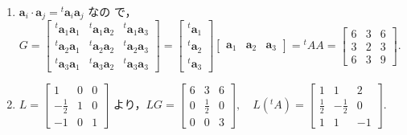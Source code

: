 \documentclass[11pt, uplatex, dvipdfmx]{jsarticle}
\begin{document}
\begin{enumerate}
\begin{enumerate}[(1)]
  \item $\bm{a}_i \cdot \bm{a}_j = {}^{t}\bm{a}_i \bm{a}_j$ なの
    で，$G= \left[
      \begin{array}{ccc}
        {}^{t}\bm{a}_1 \bm{a}_1 & {}^{t} \bm{a}_1 \bm{a}_2 & {}^{t}\bm{a}_1 \bm{a}_3\\
        {}^{t}\bm{a}_2 \bm{a}_1 & {}^{t}\bm{a}_2 \bm{a}_2 & {}^{t}\bm{a}_2 \bm{a}_3\\
        {}^{t}\bm{a}_3\bm{a}_1 & {}^{t}\bm{a}_3\bm{a}_2 & {}^{t}\bm{a}_3 \bm{a}_3
      \end{array}
    \right]=\left[
      \begin{array}{c}
        {}^{t}\bm{a}_1\\
        {}^{t}\bm{a}_2\\
        {}^{t}\bm{a}_3
      \end{array}
    \right] \left[
      \begin{array}{ccc}
        \bm{a}_1 & \bm{a}_2 & \bm{a}_3
      \end{array}
    \right]= {}^{t}AA = \left[
      \begin{array}{ccc}
        6 & 3 & 6\\
        3 & 2 & 3\\
        6 & 3 & 9
      \end{array}
    \right]$.

  \item $L=\left[
      \begin{array}{rrr}
        1 & 0 & 0\\
        -\frac{1}{2} & 1 & 0\\
        -1 & 0 & 1
      \end{array}
    \right]$ より，$LG=\left[
      \begin{array}{rrr}
        6 & 3 & 6\\
        0 & \frac{1}{2} & 0\\
        0 & 0 & 3
      \end{array}
      \right], \quad L({}^{t}A) = \left[
        \begin{array}{rrr}
          1 & 1 & 2\\
          \frac{1}{2} & -\frac{1}{2} & 0\\
          1 & 1 & -1
        \end{array}
      \right]$.


\end{enumerate}
\end{enumerate}
\end{document}
